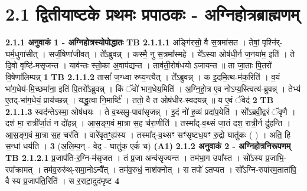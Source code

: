 \documentclass[17pt]{extarticle}
\begin{document}
     \section*{ 2.1      द्वितीयाष्टके प्रथमः प्रपाठकः - अग्निहोत्रब्राह्मणम् }
                \textbf{ 2.1.1      अनुवाकं   1 - अग्निहोत्रस्योपोद्धातः} \newline
                                \textbf{ TB 2.1.1.1} \newline
                  अङ्गि॑रसो॒ वै स॒त्रमा॑सत । तेषां॒ पृश्नि॑र्-घर्म॒धुगा॑सीत् । सर्जी॒षेणा॑जीवत् । ते᳚ऽब्रुवन्न् । कस्मै॒ नु स॒त्रमा᳚स्महे । ये᳚ऽस्या ओष॑धी॒र्न ज॒नया॑म॒ इति॑ । ते दि॒वो वृष्टि॑-मसृजन्त । याव॑न्तः स्तो॒का अ॒वाप॑द्यन्त । ताव॑ती॒रोष॑धयो ऽजायन्त ॥ ता जा॒ताः पि॒तरो॑ वि॒षेणा॑लिम्पन्न् \textbf{ 1} \newline
                  \newline
                                \textbf{ TB 2.1.1.2} \newline
                  तासां᳚ ज॒ग्ध्वा रुप्य॒न्त्यैत् । ते᳚ऽब्रुवन्न् । क इ॒दमि॒त्थ-म॑क॒रिति॑ । व॒यं भा॑ग॒धेय॑-मि॒च्छमा॑ना॒ इति॑ पि॒तरो᳚ऽब्रुवन्न् । किं ॅवो॑ भाग॒धेय॒मिति॑ । अ॒ग्नि॒हो॒त्र ए॒व नोऽप्य॒स्त्वित्य॑-ब्रुवन्न् । तेभ्य॑ ए॒तद्-भा॑ग॒धेयं॒ प्राय॑च्छन्न् । यद्धु॒त्वा नि॒मार्ष्टि॑ । ततो॒ वै त ओष॑धीर-स्वदयन्न् ॥ य ए॒वं ॅवेद॑ \textbf{ 2} \newline
                  \newline
                                \textbf{ TB 2.1.1.3} \newline
                  स्वद॑न्तेऽस्मा॒ ओष॑धयः । ते व॒थ्समु॒-पावा॑सृजन्न् । इ॒दं नो॑ ह॒व्यं प्रदा॑प॒येति॑ । सो᳚ऽब्रवी॒द्वरं॑ ॅवृणै । दश॑ मा॒ रात्री᳚र्जा॒तं न दो॑हन्न् । आ॒स॒ङ्ग॒वं मा॒त्रा स॒ह च॑रा॒णीति॑ । तस्मा᳚द्-व॒थ्सं जा॒तं दश॒ रात्री॒र्न दु॑हन्ति । आ॒स॒ङ्ग॒वं मा॒त्रा स॒ह चर॑ति । वारे॑वृतꣳ॒॒ह्य॑स्य । तस्मा᳚द्-व॒थ्सꣳ सꣳ॑सृष्टध॒यꣳ रु॒द्रो घातु॑कः ( ) । अति॒ हि स॒न्धां धय॑ति । \textbf{ 3} \newline
                  \newline
                                    (अ॒लि॒म्प॒न् - वेद॒ - घातु॑क॒ एकं॑ च) \textbf{(A1)} \newline \newline
                \textbf{ 2.1.2      अनुवाकं   2 - अग्निहोत्रनिरूपणम्} \newline
                                \textbf{ TB 2.1.2.1} \newline
                  प्र॒जाप॑ति-र॒ग्नि-म॑सृजत । तं प्र॒जा अन्व॑सृज्यन्त । तम॑भा॒ग उपा᳚स्त । सो᳚ऽस्य प्र॒जाभि॒-रपा᳚क्रामत् । तम॑व॒रुरु॑थ्-समा॒नोऽन्वै᳚त् । तम॑व॒रुधं॒ नाश॑क्नोत् । स तपो॑ ऽतप्यत । सो᳚ऽग्नि-रुपा॑रम॒ताता॑पि॒ वै स्य प्र॒जाप॑ति॒रिति॑ । स र॒राटा॒दुद॑मृष्ट \textbf{ 4} \newline
\end{document}
